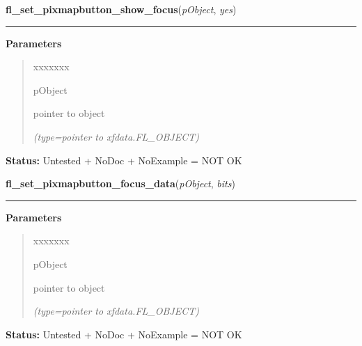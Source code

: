 \hspace{.8\funcindent}\begin{boxedminipage}{\funcwidth}

    \raggedright \textbf{fl\_set\_pixmapbutton\_show\_focus}(\textit{pObject}, \textit{yes})

    \vspace{-1.5ex}

    \rule{\textwidth}{0.5\fboxrule}
\setlength{\parskip}{2ex}
\setlength{\parskip}{1ex}
      \textbf{Parameters}
      \vspace{-1ex}

      \begin{quote}
        \begin{Ventry}{xxxxxxx}

          \item[pObject]

          pointer to object

            {\it (type=pointer to xfdata.FL\_OBJECT)}

        \end{Ventry}

      \end{quote}

\textbf{Status:} Untested + NoDoc + NoExample = NOT OK



    \end{boxedminipage}

    \label{xformslib:library:fl_set_pixmapbutton_focus_data}

    \vspace{0.5ex}

\hspace{.8\funcindent}\begin{boxedminipage}{\funcwidth}

    \raggedright \textbf{fl\_set\_pixmapbutton\_focus\_data}(\textit{pObject}, \textit{bits})

    \vspace{-1.5ex}

    \rule{\textwidth}{0.5\fboxrule}
\setlength{\parskip}{2ex}
\setlength{\parskip}{1ex}
      \textbf{Parameters}
      \vspace{-1ex}

      \begin{quote}
        \begin{Ventry}{xxxxxxx}

          \item[pObject]

          pointer to object

            {\it (type=pointer to xfdata.FL\_OBJECT)}

        \end{Ventry}

      \end{quote}

\textbf{Status:} Untested + NoDoc + NoExample = NOT OK



    \end{boxedminipage}

